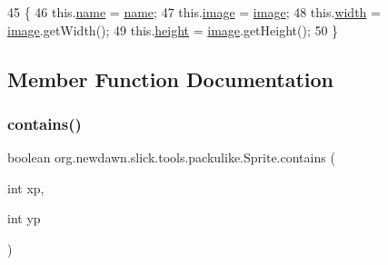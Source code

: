 \begin{DoxyCode}
45                                                     \{
46         this.\mbox{\hyperlink{classorg_1_1newdawn_1_1slick_1_1tools_1_1packulike_1_1_sprite_a8cad2e7ed5b25766e5b16d76a96ce831}{name}} = \mbox{\hyperlink{classorg_1_1newdawn_1_1slick_1_1tools_1_1packulike_1_1_sprite_a8cad2e7ed5b25766e5b16d76a96ce831}{name}};
47         this.\mbox{\hyperlink{classorg_1_1newdawn_1_1slick_1_1tools_1_1packulike_1_1_sprite_a021954101cf2a5afc580af29559ab4e5}{image}} = \mbox{\hyperlink{classorg_1_1newdawn_1_1slick_1_1tools_1_1packulike_1_1_sprite_a021954101cf2a5afc580af29559ab4e5}{image}};
48         this.\mbox{\hyperlink{classorg_1_1newdawn_1_1slick_1_1tools_1_1packulike_1_1_sprite_a4246c9fcd258ce9268d69532b384c977}{width}} = \mbox{\hyperlink{classorg_1_1newdawn_1_1slick_1_1tools_1_1packulike_1_1_sprite_a021954101cf2a5afc580af29559ab4e5}{image}}.getWidth();
49         this.\mbox{\hyperlink{classorg_1_1newdawn_1_1slick_1_1tools_1_1packulike_1_1_sprite_a33d551a688d84bce77065b00c4309eab}{height}} = \mbox{\hyperlink{classorg_1_1newdawn_1_1slick_1_1tools_1_1packulike_1_1_sprite_a021954101cf2a5afc580af29559ab4e5}{image}}.getHeight();
50     \}
\end{DoxyCode}


\subsection{Member Function Documentation}
\mbox{\label{classorg_1_1newdawn_1_1slick_1_1tools_1_1packulike_1_1_sprite_a54369795408db83608e37298cb02de94}} 
\subsubsection{\texorpdfstring{contains()}{contains()}}
{\footnotesize\ttfamily boolean org.\+newdawn.\+slick.\+tools.\+packulike.\+Sprite.\+contains (\begin{DoxyParamCaption}\item[{int}]{xp,  }\item[{int}]{yp }\end{DoxyParamCaption})\hspace{0.3cm}{\ttfamily [inline]}}

